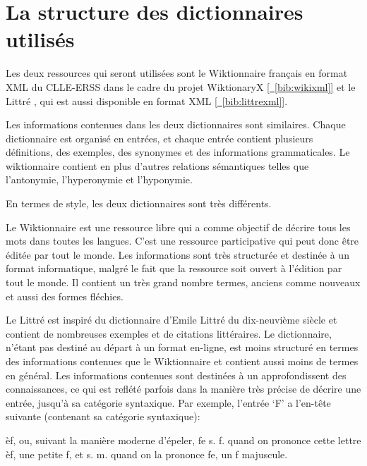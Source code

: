 \section{La structure des dictionnaires utilisés}

Les deux ressources qui seront utilisées sont le Wiktionnaire français en 
format XML du CLLE-ERSS dans le cadre du projet WiktionaryX 
\hyperref[bib:wikixml]{[~\ref*{bib:wikixml}]} et le Littré , qui est aussi 
disponible en format XML \hyperref[bib:littrexml]{[~\ref*{bib:littrexml}]}.

Les informations contenues dans les deux dictionnaires sont similaires. Chaque 
dictionnaire est organisé en entrées, et chaque entrée contient plusieurs 
définitions, des exemples, des synonymes et des informations grammaticales. Le 
wiktionnaire contient en plus d'autres relations sémantiques telles que 
l'antonymie, l'hyperonymie et l’hyponymie.

En termes de style, les deux dictionnaires sont très différents. 

Le Wiktionnaire est une ressource libre qui a comme objectif de décrire tous 
les mots dans toutes les langues. C'est une ressource participative qui peut 
donc être éditée par tout le monde. Les informations sont très structurée et 
destinée à un format informatique, malgré le fait que la ressource soit ouvert 
à l'édition par tout le monde. Il contient un très grand nombre termes, anciens 
comme nouveaux et aussi des formes fléchies.

Le Littré est inspiré du dictionnaire d'Emile Littré du dix-neuvième siècle et 
contient de nombreuses exemples et de citations littéraires. Le dictionnaire, 
n'étant pas destiné au départ à un format en-ligne, est moins structuré en 
termes des informations contenues que le Wiktionnaire et contient aussi moins de 
termes en général. Les informations contenues sont destinées à un 
approfondissent des connaissances, ce qui est reflété parfois dans la manière 
très précise de décrire une entrée, jusqu'à sa catégorie syntaxique. Par 
exemple, l'entrée \lq{F}\rq{} a l'en-tête suivante (contenant sa catégorie 
syntaxique):

\begin{framed}
\newline
{}\newline
èf, ou, suivant la manière moderne d'épeler, fe 
	 s. f. quand on prononce cette lettre èf, une petite f, et 
	s. m. quand on la prononce fe, un f majuscule. \newline
{}
\end{framed}

